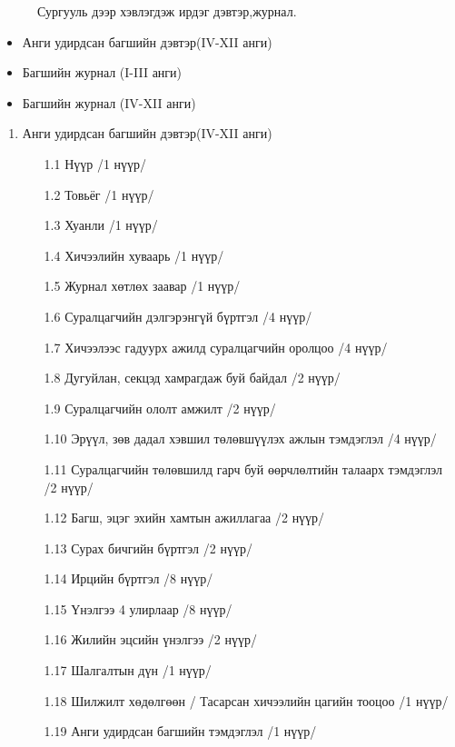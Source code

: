 \begin{figure}[htbp]
	\caption[Хэрэглэгчийн судалгаа]{Сургууль дээр хэвлэгдэж ирдэг дэвтэр,журнал.}
\end{figure}

\begin{itemize}
\item Анги удирдсан багшийн дэвтэр(IV-XII анги)
\item Багшийн журнал (I-III анги)
\item Багшийн журнал (IV-XII анги)
\end{itemize}
	
\begin{enumerate}
	\item Анги удирдсан багшийн дэвтэр(IV-XII анги)
	\begin{enumerate}
		\item[1.1] Нүүр /1 нүүр/
		\item[1.2] Товьёг /1 нүүр/
		\item[1.3] Хуанли /1 нүүр/
		\item[1.4] Хичээлийн хуваарь /1 нүүр/
		\item[1.5] Журнал хөтлөх заавар /1 нүүр/
		\item[1.6] Суралцагчийн дэлгэрэнгүй бүртгэл /4 нүүр/
		\item[1.7] Хичээлээс гадуурх ажилд суралцагчийн оролцоо /4 нүүр/
		\item[1.8] Дугуйлан, секцэд хамрагдаж буй байдал /2 нүүр/
		\item[1.9] Суралцагчийн ололт амжилт /2 нүүр/
		\item[1.10] Эрүүл, зөв дадал хэвшил төлөвшүүлэх ажлын тэмдэглэл /4 нүүр/
		\item[1.11] Суралцагчийн төлөвшилд гарч буй өөрчлөлтийн талаарх тэмдэглэл /2 нүүр/
		\item[1.12] Багш, эцэг эхийн хамтын ажиллагаа /2 нүүр/
		\item[1.13] Сурах бичгийн бүртгэл /2 нүүр/
		\item[1.14] Ирцийн бүртгэл /8 нүүр/
		\item[1.15] Үнэлгээ 4 улирлаар /8 нүүр/
		\item[1.16] Жилийн эцсийн үнэлгээ /2 нүүр/
		\item[1.17] Шалгалтын дүн /1 нүүр/
		\item[1.18] Шилжилт хөдөлгөөн / Тасарсан хичээлийн цагийн тооцоо /1 нүүр/
		\item[1.19] Анги удирдсан багшийн тэмдэглэл /1 нүүр/\\ 
		\begin{flushright}

\end{flushright}
\end{enumerate}
\end{enumerate}

